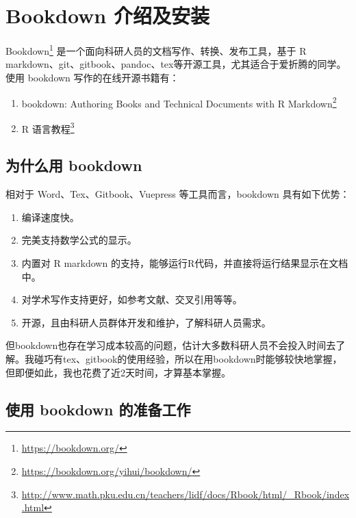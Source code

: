 \documentclass[]{ctexbook}
\providecommand{\tightlist}{%
  \setlength{\itemsep}{0pt}\setlength{\parskip}{0pt}}
\renewcommand{\href}[2]{#2\footnote{\url{#1}}}
\begin{document}
\mainmatter

\hypertarget{intro}{%
\chapter{Bookdown 介绍及安装}\label{intro}}

\href{https://bookdown.org/}{Bookdown} 是一个面向科研人员的文档写作、转换、发布工具，基于 R markdown、git、gitbook、pandoc、tex等开源工具，尤其适合于爱折腾的同学。使用 bookdown 写作的在线开源书籍有：

\begin{enumerate}
\def\labelenumi{\arabic{enumi}.}
\tightlist
\item
  \href{https://bookdown.org/yihui/bookdown/}{bookdown: Authoring Books and Technical Documents with R Markdown}
\item
  \href{http://www.math.pku.edu.cn/teachers/lidf/docs/Rbook/html/_Rbook/index.html}{R 语言教程}
\end{enumerate}

\hypertarget{ux4e3aux4ec0ux4e48ux7528-bookdown}{%
\section{为什么用 bookdown}\label{ux4e3aux4ec0ux4e48ux7528-bookdown}}

相对于 Word、Tex、Gitbook、Vuepress 等工具而言，bookdown 具有如下优势：

\begin{enumerate}
\def\labelenumi{\arabic{enumi}.}
\tightlist
\item
  编译速度快。
\item
  完美支持数学公式的显示。
\item
  内置对 R markdown 的支持，能够运行R代码，并直接将运行结果显示在文档中。
\item
  对学术写作支持更好，如参考文献、交叉引用等等。
\item
  开源，且由科研人员群体开发和维护，了解科研人员需求。
\end{enumerate}

但bookdown也存在学习成本较高的问题，估计大多数科研人员不会投入时间去了解。我碰巧有tex、gitbook的使用经验，所以在用bookdown时能够较快地掌握，但即便如此，我也花费了近2天时间，才算基本掌握。

\hypertarget{ux4f7fux7528-bookdown-ux7684ux51c6ux5907ux5de5ux4f5c}{%
\section{使用 bookdown 的准备工作}\label{ux4f7fux7528-bookdown-ux7684ux51c6ux5907ux5de5ux4f5c}}
\end{document}

